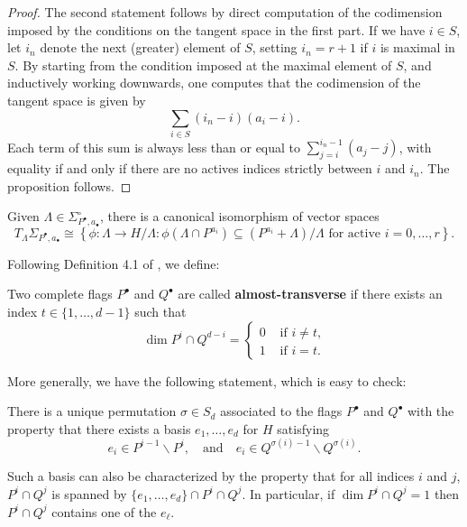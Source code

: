 \documentclass{amsart}
\begin{document}
\begin{proof}
The second statement follows by direct computation of the codimension
imposed by the conditions on the tangent space in the first part.
If we have $i \in S$, let $i_n$ denote the next (greater) element of $S$,
setting $i_n=r+1$ if $i$ is maximal in $S$. By starting from the condition
imposed at the maximal element of $S$, and inductively working downwards,
one computes that the codimension of the tangent space is given by
$$\sum_{i \in S} (i_n-i)(a_i-i).$$
Each term of this sum is always less than or equal to 
$\sum_{j=i}^{i_n-1} (a_j-j)$, with equality if and only if there are no
actives indices strictly between $i$ and $i_n$. The proposition follows.
\end{proof}

\begin{cor}
\label{cor:tangent-schubert-circ} Given 
$\Lambda \in {\Sigma}^\circ_{P^{\bullet},a_{\bullet}}$,
there is a canonical isomorphism of vector spaces
$$T_{\Lambda}\Sigma_{P^{\bullet},a_{\bullet}}\cong 
\left\{\phi\colon \Lambda\to H/\Lambda: \phi(\Lambda \cap P^{a_i}) 
\subseteq (P^{a_i}+\Lambda)/\Lambda \text{ for active } i=0,\ldots,r\right\}.$$
\end{cor}

%
%

Following Definition 4.1 of \cite{c-p3}, we define:

\begin{defn} \label{def:a-t} Two complete flags $P^{\bullet}$ and $Q^{\bullet}$ are called 
\textbf{almost-transverse} if there exists an index $t\in\{1,\ldots,d-1\}$ 
such that
$$\dim P^i \cap Q^{d-i} 
= \begin{cases} 0 & \text{ if $i\ne t$,}\\ 1 & \text{ if }i=t.\end{cases}$$
\end{defn}

More generally, we have the following statement, which is easy to check:

\begin{prop}\label{prop:sigma} 
There is a unique permutation $\sigma \in S_d$ associated to the
flags $P^{\bullet}$ and $Q^{\bullet}$ with the property 
that there exists a basis $e_1,\ldots,e_d$ for $H$ satisfying
$$e_i \in P^{i-1}\smallsetminus P^i, \quad \text{and} \quad
e_i \in Q^{\sigma(i)-1} \smallsetminus Q^{\sigma(i)}.$$

Such a basis can also be characterized by the property that for all indices 
$i$ and $j$,
$P^i\cap Q^j$ is spanned by $\{e_1,\ldots,e_d\}\cap P^i\cap Q^j$.
In particular, if $\dim P^i\cap Q^j = 1$ then $P^i\cap Q^j$ contains one
of the $e_{\ell}$.
\end{prop}
\end{document}
